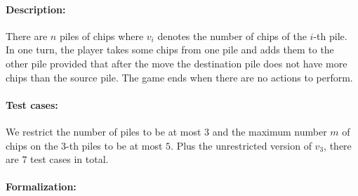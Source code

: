 \documentclass[review]{elsarticle}
\begin{document}
\paragraph{Description:} 
There are $n$ piles of chips where $v_i$ denotes the number of chips of the $i$-th pile.
In one turn, the player takes some chips from one pile and adds them to the other pile provided that after the move the destination pile does not have more chips than the source pile. 
The game ends when there are no actions to perform.

\paragraph{Test cases:}
We restrict the number of piles to be at most $3$ and the maximum number $m$ of chips on the $3$-th piles to be at most $5$.
Plus the unrestricted version of $v_3$, there are $7$ test cases in total.

\paragraph{Formalization:}
\end{document}

